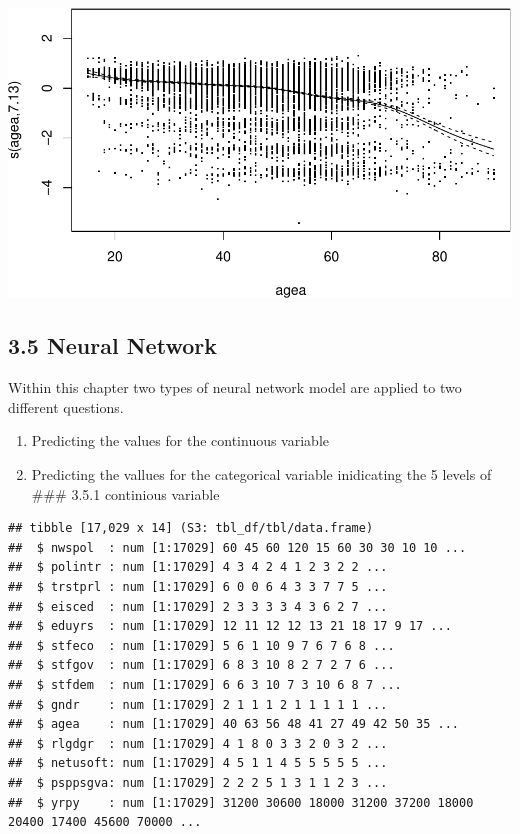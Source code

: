 \documentclass[
]{article}
\providecommand{\tightlist}{%
  \setlength{\itemsep}{0pt}\setlength{\parskip}{0pt}}
\begin{document}
\includegraphics{ESS_DE_files/figure-latex/unnamed-chunk-8-2.pdf}

\hypertarget{neural-network}{%
\subsection{3.5 Neural Network}\label{neural-network}}

Within this chapter two types of neural network model are applied to two
different questions.

\begin{enumerate}
\def\labelenumi{\arabic{enumi}.}
\tightlist
\item
  Predicting the values for the continuous variable
\item
  Predicting the vallues for the categorical variable inidicating the 5
  levels of \#\#\# 3.5.1 continious variable
\end{enumerate}

\begin{verbatim}
## tibble [17,029 x 14] (S3: tbl_df/tbl/data.frame)
##  $ nwspol  : num [1:17029] 60 45 60 120 15 60 30 30 10 10 ...
##  $ polintr : num [1:17029] 4 3 4 2 4 1 2 3 2 2 ...
##  $ trstprl : num [1:17029] 6 0 0 6 4 3 3 7 7 5 ...
##  $ eisced  : num [1:17029] 2 3 3 3 3 4 3 6 2 7 ...
##  $ eduyrs  : num [1:17029] 12 11 12 12 13 21 18 17 9 17 ...
##  $ stfeco  : num [1:17029] 5 6 1 10 9 7 6 7 6 8 ...
##  $ stfgov  : num [1:17029] 6 8 3 10 8 2 7 2 7 6 ...
##  $ stfdem  : num [1:17029] 6 6 3 10 7 3 10 6 8 7 ...
##  $ gndr    : num [1:17029] 2 1 1 1 2 1 1 1 1 1 ...
##  $ agea    : num [1:17029] 40 63 56 48 41 27 49 42 50 35 ...
##  $ rlgdgr  : num [1:17029] 4 1 8 0 3 3 2 0 3 2 ...
##  $ netusoft: num [1:17029] 4 5 1 1 4 5 5 5 5 5 ...
##  $ psppsgva: num [1:17029] 2 2 2 5 1 3 1 1 2 3 ...
##  $ yrpy    : num [1:17029] 31200 30600 18000 31200 37200 18000 20400 17400 45600 70000 ...
\end{verbatim}
\end{document}
